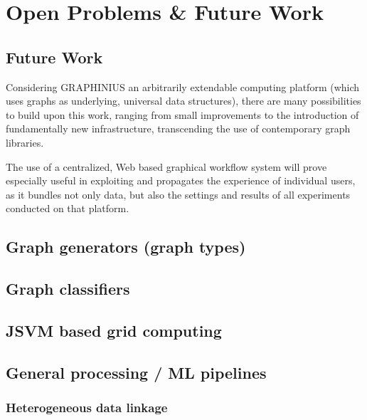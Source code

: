\chapter{Open Problems \& Future Work}
\label{ch:future_work}



\section{Future Work}
\label{sect:future_challenges}

Considering GRAPHINIUS an arbitrarily extendable computing platform (which uses graphs as underlying, universal data structures), there are many possibilities to build upon this work, ranging from small improvements to the introduction of fundamentally new infrastructure, transcending the use of contemporary graph libraries. 

The use of a centralized, Web based graphical workflow system will prove especially useful in exploiting and propagates the experience of individual users, as it bundles not only data, but also the settings and results of all experiments conducted on that platform.


\section{Graph generators (graph types)}
\label{sect:graph_gen}


\section{Graph classifiers}
\label{sect:graph_class}


\section{JSVM based grid computing}
\label{sect:jsvm_grid}


\section{General processing / ML pipelines}
\label{sect:pipelines}


\subsection{Heterogeneous data linkage}
\label{ssect:heterogeneous_data}

